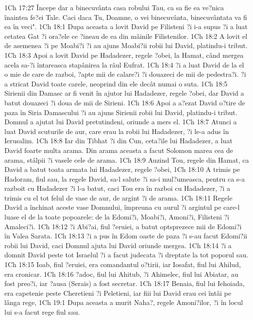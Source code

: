 1Ch 17:27  Începe dar a binecuvânta casa robului Tau, ca sa fie ea ve?nica înaintea fe?ei Tale. Caci daca Tu, Doamne, o vei binecuvânta, binecuvântata va fi ea în veci".
1Ch 18:1  Dupa aceasta a lovit David pe Filisteni ?i i-a supus ?i a luat cetatea Gat ?i ora?ele ce ?ineau de ea din mâinile Filistenilor.
1Ch 18:2  A lovit el de asemenea ?i pe Moabi?i ?i au ajuns Moabi?ii robii lui David, platindu-i tribut.
1Ch 18:3  Apoi a lovit David pe Hadadezer, regele ?obei, la Hamat, când mergea acela sa-?i întareasca stapânirea la râul Eufrat.
1Ch 18:4  ?i a luat David de la el o mie de care de razboi, ?apte mii de calare?i ?i douazeci de mii de pedestra?i. ?i a stricat David toate carele, neoprind din ele decât numai o suta.
1Ch 18:5  Sirienii din Damasc ar fi venit în ajutor lui Hadadezer, regele ?obei, dar David a batut douazeci ?i doua de mii de Sirieni.
1Ch 18:6  Apoi a a?ezat David o?tire de paza în Siria Damascului ?i au ajuns Sirienii robii lui David, platindu-i tribut. Domnul a ajutat lui David pretutindeni, oriunde a mers el.
1Ch 18:7  Atunci a luat David scuturile de aur, care erau la robii lui Hadadezer, ?i le-a adus în Ierusalim.
1Ch 18:8  Iar din Tibhat ?i din Cun, ceta?ile lui Hadadezer, a luat David foarte multa arama. Din arama aceasta a facut Solomon marea cea de arama, stâlpii ?i vasele cele de arama.
1Ch 18:9  Auzind Tou, regele din Hamat, ca David a batut toata armata lui Hadadezer, regele ?obei,
1Ch 18:10  A trimis pe Hadoram, fiul sau, la regele David, sa-l salute ?i sa-i mul?umeasca, pentru ca s-a razboit cu Hadadezer ?i l-a batut, caci Tou era în razboi cu Hadadezer, ?i a trimis cu el tot felul de vase de aur, de argint ?i de arama.
1Ch 18:11  Regele David a închinat aceste vase Domnului, împreuna cu aurul ?i argintul pe care-l luase el de la toate popoarele: de la Edomi?i, Moabi?i, Amoni?i, Filisteni ?i Amaleci?i.
1Ch 18:12  ?i Abi?ai, fiul ?eruiei, a batut optsprezece mii de Edomi?i în Valea Sarata.
1Ch 18:13  ?i a pus în Edom oaste de paza ?i s-au facut Edomi?ii robii lui David, caci Domnul ajuta lui David oriunde mergea.
1Ch 18:14  ?i a domnit David peste tot Israelul ?i a facut judecata ?i dreptate la tot poporul sau.
1Ch 18:15  Ioab, fiul ?eruiei, era comandantul o?tirii, iar Iosafat, fiul lui Ahilud, era cronicar.
1Ch 18:16  ?adoc, fiul lui Ahitub, ?i Ahimelec, fiul lui Abiatar, au fost preo?i, iar ?ausa (Serais) a fost secretar.
1Ch 18:17  Benaia, fiul lui Iehoiada, era capetenie peste Cheretieni ?i Peletieni, iar fiii lui David erau cei întâi pe lânga rege,
1Ch 19:1  Dupa aceasta a murit Naha?, regele Amoni?ilor, ?i în locul lui s-a facut rege fiul sau.
